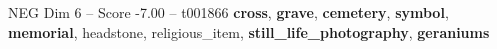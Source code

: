 \begin{textsample}{NEG Dim 6 – Score -7.00 – t001866}  \label{ex:f6_neg_022}
\textbf{cross}, \textbf{grave}, \textbf{cemetery}, \textbf{symbol}, \textbf{memorial}, headstone, religious\_item, \textbf{still\_life\_photography}, \textbf{geraniums}

\end{textsample}
